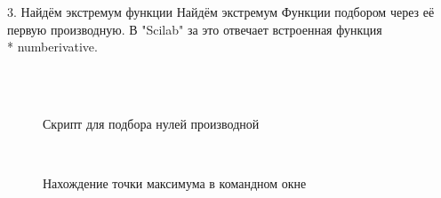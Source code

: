 \documentclass[russian,utf8,nocolumnxxxi,nocolumnxxxii]{eskdtext}
\begin{document}
3. Найдём экстремум функции
 Найдём экстремум Функции подбором  через её первую производную. В "Scilab" за это отвечает встроенная функция \\*
 numberivative.
\\ \\
\begin{figure}[H]
 \\
\caption{Скрипт для подбора нулей производной}
\end{figure}

\begin{figure}[H]
 \\
\caption{Нахождение точки максимума в командном окне}
\end{figure}
 
\end{document}
